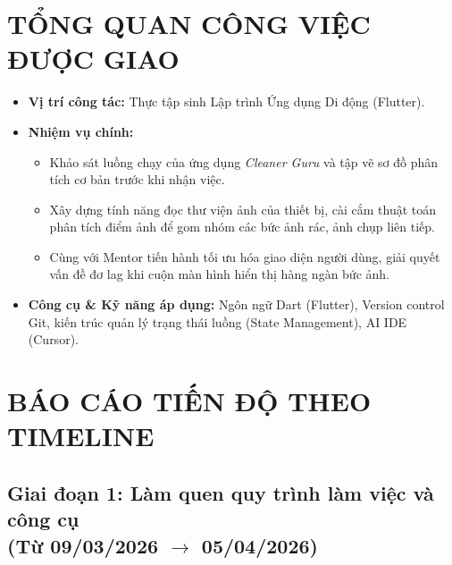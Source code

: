 \documentclass[12pt, a4paper]{article}
\begin{document}
\section{TỔNG QUAN CÔNG VIỆC ĐƯỢC GIAO}
\begin{itemize}
    \item \textbf{Vị trí công tác:} Thực tập sinh Lập trình Ứng dụng Di động (Flutter).
    \item \textbf{Nhiệm vụ chính:} 
    \begin{itemize}
        \item Khảo sát luồng chạy của ứng dụng \textit{Cleaner Guru} và tập vẽ sơ đồ phân tích cơ bản trước khi nhận việc.
        \item Xây dựng tính năng đọc thư viện ảnh của thiết bị, cài cắm thuật toán phân tích điểm ảnh để gom nhóm các bức ảnh rác, ảnh chụp liên tiếp.
        \item Cùng với Mentor tiến hành tối ưu hóa giao diện người dùng, giải quyết vấn đề đơ lag khi cuộn màn hình hiển thị hàng ngàn bức ảnh.
    \end{itemize}
    \item \textbf{Công cụ \& Kỹ năng áp dụng:} Ngôn ngữ Dart (Flutter), Version control Git, kiến trúc quản lý trạng thái luồng (State Management), AI IDE (Cursor).
\end{itemize}

\section{BÁO CÁO TIẾN ĐỘ THEO TIMELINE}
\subsection[Giai đoạn 1: Làm quen quy trình làm việc và công cụ (Từ 09/03/2026 đến 05/04/2026)]{Giai đoạn 1: Làm quen quy trình làm việc và công cụ \\(Từ 09/03/2026 $\rightarrow$ 05/04/2026)}
\end{document}
